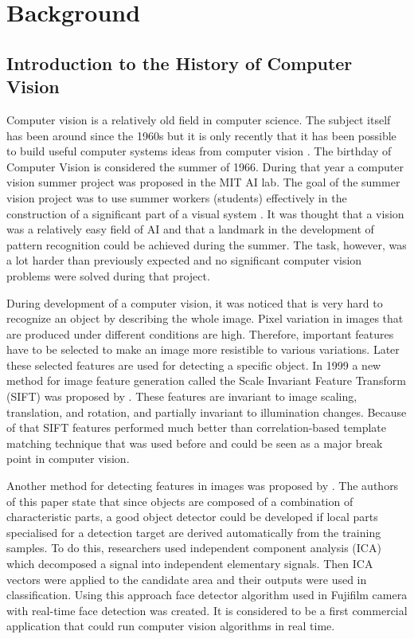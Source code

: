 \chapter{Background}

\section{Introduction to the History of Computer Vision}
\label{sec:intro}


Computer vision is a relatively old field in computer science. The subject itself has been around since the 1960s but it is only recently that it has been possible to build useful computer systems ideas from computer vision \citep {cv}.
The birthday of Computer Vision is considered the summer of 1966.  During that year a computer vision summer project was proposed in the MIT AI lab. The goal of the summer vision project was to use summer workers (students) effectively in the construction of a significant part of a visual system  \citep{papert}. It was thought that a vision was a relatively easy field of AI and that a landmark in the development of pattern recognition could be achieved during the summer. The task, however, was a lot harder than previously expected and no significant computer vision problems were solved during that project.

During development of a computer vision, it was noticed that is very hard to recognize an object by describing the whole image. Pixel variation in images that are produced under different conditions are high. Therefore, important features have to be selected to make an image more resistible to various variations. Later these selected features are used for detecting a specific object. In 1999 a new method for image feature generation called the Scale Invariant Feature Transform (SIFT) was proposed by \cite{sift}. These features are invariant to image scaling, translation, and rotation, and partially invariant to illumination changes. Because of that SIFT features performed much better than correlation-based template matching technique that was used before and could be seen as a major break point in computer vision.
 
Another method for detecting features in images was proposed by \cite{nakano2006object}. The authors of this paper state that since objects are composed of a combination of characteristic parts, a good object detector could be developed if local parts specialised for a detection target are derived automatically from the training samples. To do this, researchers used independent component analysis (ICA) which   decomposed a signal into independent elementary signals. Then ICA vectors were applied to the candidate area and their outputs were used in classification. Using this approach face detector algorithm used in Fujifilm camera with real-time face detection was created. It is considered to be a first commercial application that could run computer vision algorithms in real time. 
 
